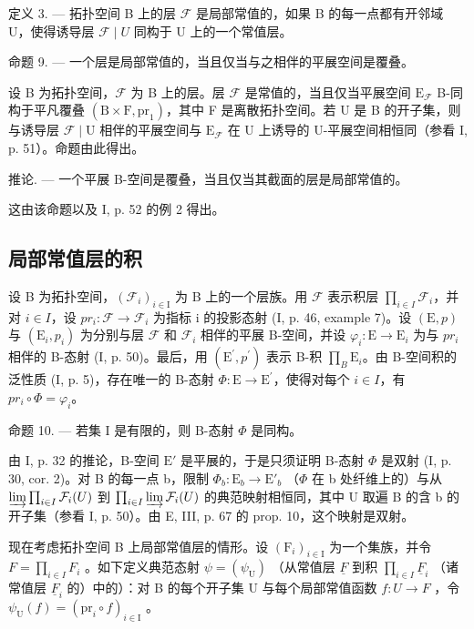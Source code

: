 定义 3. --- 拓扑空间 B 上的层 \(\mathcal{F}\) 是局部常值的，如果 B 的每一点都有开邻域 U，使得诱导层 \(\mathcal{F} \mid U\) 同构于 U 上的一个常值层。

命题 9. --- 一个层是局部常值的，当且仅当与之相伴的平展空间是覆叠。

设 B 为拓扑空间，\(\mathcal{F}\) 为 B 上的层。层 \(\mathcal{F}\) 是常值的，当且仅当平展空间 \(\mathrm{E}_{\mathcal{F}}\) B-同构于平凡覆叠 \((\mathrm{B} \times \mathrm{F},\mathrm{pr}_1)\)，其中 F 是离散拓扑空间。若 U 是 B 的开子集，则与诱导层 \(\mathcal{F} \mid \mathrm{U}\) 相伴的平展空间与 \(\mathrm{E}_{\mathcal{F}}\) 在 U 上诱导的 U-平展空间相恒同（参看 I, p. 51）。命题由此得出。

推论. --- 一个平展 B-空间是覆叠，当且仅当其截面的层是局部常值的。

这由该命题以及 I, p. 52 的例 2 得出。

\subsection{局部常值层的积}

设 B 为拓扑空间，\((\mathcal{F}_{i})_{i\in\mathrm{I}}\) 为 B 上的一个层族。用 \(\mathcal{F}\) 表示积层 \(\prod_{i\in I}\mathcal{F}_{i}\)，并对 \(i\in I\)，设 \(pr_{i}\colon \mathcal{F}\to\mathcal{F}_{i}\) 为指标 i 的投影态射 (I, p. 46, example 7)。设 \((\mathrm{E},p)\) 与 \((\mathrm{E}_{i},p_{i})\) 为分别与层 \(\mathcal{F}\) 和 \(\mathcal{F}_{i}\) 相伴的平展 B-空间，并设 \(\varphi_{i}\colon \mathrm{E}\to \mathrm{E}_{i}\) 为与 \(pr_{i}\) 相伴的 B-态射 (I, p. 50)。最后，用 \((\mathrm{E}^{\prime},p^{\prime})\) 表示 B-积 \(\prod_{B}\mathrm{E}_{i}\)。由 B-空间积的泛性质 (I, p. 5)，存在唯一的 B-态射 \(\Phi\colon \mathrm{E}\to \mathrm{E}^{\prime}\)，使得对每个 \(i\in I\)，有 \(pr_{i}\circ\Phi=\varphi_{i}\)。

命题 10. --- 若集 I 是有限的，则 B-态射 \(\Phi\) 是同构。

由 I, p. 32 的推论，B-空间 \(\mathrm{E}'\) 是平展的，于是只须证明 B-态射 \(\Phi\) 是双射 (I, p. 30, cor. 2)。对 B 的每一点 b，限制 \(\Phi_b\colon \mathrm{E}_b\to \mathrm{E}'_b\) （\(\Phi\) 在 b 处纤维上的）与从 \(\varinjlim\prod_{i\in I}\mathcal{F}_{i}(U)\) 到 \(\prod_{i\in I}\varinjlim\mathcal{F}_{i}(U)\) 的典范映射相恒同，其中 U 取遍 B 的含 b 的开子集（参看 I, p. 50）。由 E, III, p. 67 的 prop. 10，这个映射是双射。

现在考虑拓扑空间 B 上局部常值层的情形。设 \((\mathrm{F}_{i})_{i\in\mathrm{I}}\) 为一个集族，并令 \(F=\prod_{i\in I}F_{i}\) 。如下定义典范态射 \(\psi=(\psi_{\mathrm{U}})\) （从常值层 \(\underline{F}\) 到积 \(\prod_{i\in I}\underline{F}_{i}\) （诸常值层 \(\underline{F}_{i}\) 的）中的）：对 B 的每个开子集 U 与每个局部常值函数 \(f\colon U\to F\) ，令 \(\psi_{\mathrm{U}}(f)=(\mathrm{pr}_{i}\circ f)_{i\in\mathrm{I}}\) 。

